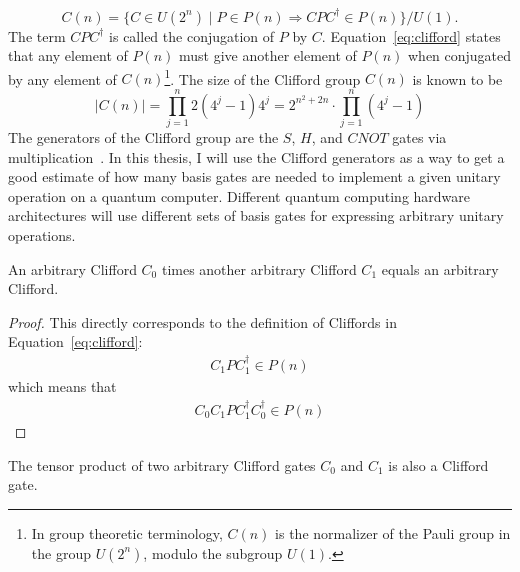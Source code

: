 \begin{equation}
\label{eq:clifford}
C(n)
=
\{
C \in U(2^n) 
\mid 
P \in P(n)
\Rightarrow 
C P C^\dagger \in P(n)
\}
/
U(1).
\end{equation}
The term $C P C^\dagger$ 
is called the conjugation of $P$ by $C$. Equation~\eqref{eq:clifford} states that any element of $P(n)$ must give another element of $P(n)$ when conjugated by any element of $C(n)$\footnote{In group theoretic terminology, $C(n)$ is the normalizer of the Pauli group in the group $U(2^n)$, modulo the subgroup $U(1)$.}. The size of the Clifford group $C(n)$ is known to be
\begin{equation}
\label{eq:cliffordgroupcardinal}
\vert C(n) \vert
=
\displaystyle\prod_{j=1}^n 2(4^j - 1) 4^j 
=
2^{n^{2}+2n} \cdot \displaystyle\prod_{j=1}^n \left(4^{j} -1 \right)
\end{equation}
The generators of the Clifford group are the $S$, $H$, and $\mathit{CNOT}$ gates via multiplication~\cite{ozols2008clifford}. In this thesis, I will use the Clifford generators as a way to get a good estimate of how many basis gates are needed to implement a given unitary operation on a quantum computer. Different quantum computing hardware architectures will use different sets of basis gates for expressing arbitrary unitary operations.
\begin{theorem}
\label{theorem:cliffordTimesClifford}
An arbitrary Clifford $C_0$ times another arbitrary Clifford $C_1$ equals an arbitrary Clifford.
\end{theorem}
\begin{proof}
This directly corresponds to the definition of Cliffords in Equation~\eqref{eq:clifford}:
\begin{align}
C_1 P C_1^\dagger \in P(n)
\end{align}
which means that
\begin{align}
C_0C_1 P C_1^\dagger C_0^\dagger \in P(n)
\end{align}
\end{proof}
\begin{theorem}
\label{theorem:cliffTensorProduct}
The tensor product of two arbitrary Clifford gates $C_0$ and $C_1$ is also a Clifford gate.
\end{theorem}
